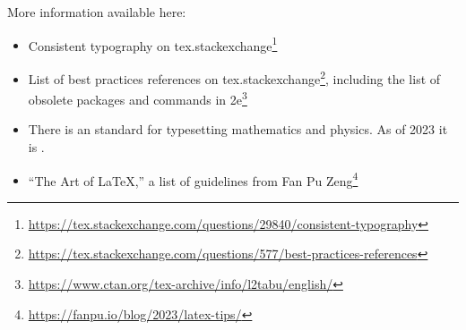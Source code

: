 More information available here:
\begin{itemize}
	\item Consistent typography on tex.stackexchange\footnote{\url{https://tex.stackexchange.com/questions/29840/consistent-typography}}
	\item List of best practices references on tex.stackexchange\footnote{\url{https://tex.stackexchange.com/questions/577/best-practices-references}}, including the list of obsolete packages and commands in 2e\footnote{\url{https://www.ctan.org/tex-archive/info/l2tabu/english/}}
	\item There is an  standard for typesetting mathematics and physics. As of 2023 it is .
	\item ``The Art of \LaTeX,'' a list of guidelines from Fan Pu Zeng\footnote{\url{https://fanpu.io/blog/2023/latex-tips/}}
\end{itemize}
